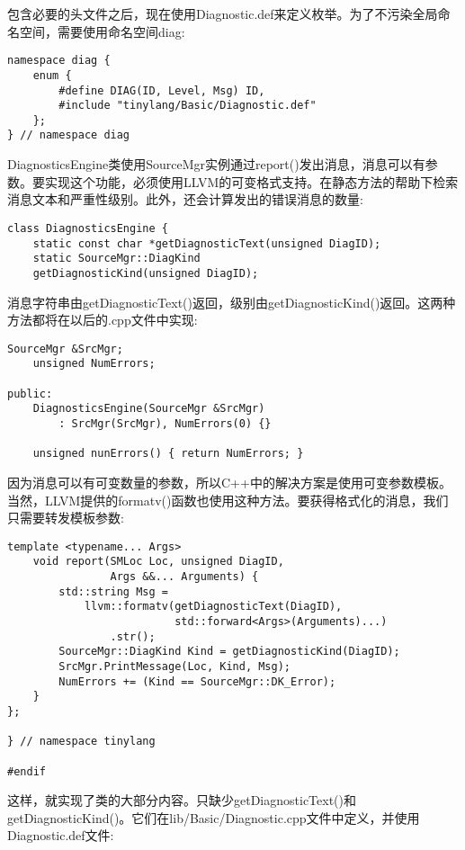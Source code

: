 包含必要的头文件之后，现在使用Diagnostic.def来定义枚举。为了不污染全局命名空间，需要使用命名空间diag:\par

\begin{lstlisting}[caption={}]
namespace diag {
	enum {
		#define DIAG(ID, Level, Msg) ID,
		#include "tinylang/Basic/Diagnostic.def"
	};
} // namespace diag
\end{lstlisting}

DiagnosticsEngine类使用SourceMgr实例通过report()发出消息，消息可以有参数。要实现这个功能，必须使用LLVM的可变格式支持。在静态方法的帮助下检索消息文本和严重性级别。此外，还会计算发出的错误消息的数量:\par

\begin{lstlisting}[caption={}]
class DiagnosticsEngine {
	static const char *getDiagnosticText(unsigned DiagID);
	static SourceMgr::DiagKind
	getDiagnosticKind(unsigned DiagID);
\end{lstlisting}

消息字符串由getDiagnosticText()返回，级别由getDiagnosticKind()返回。这两种方法都将在以后的.cpp文件中实现:\par

\begin{lstlisting}[caption={}]
	SourceMgr &SrcMgr;
	unsigned NumErrors;
	
public:
	DiagnosticsEngine(SourceMgr &SrcMgr)
		: SrcMgr(SrcMgr), NumErrors(0) {}
		
	unsigned nunErrors() { return NumErrors; }
\end{lstlisting}

因为消息可以有可变数量的参数，所以C++中的解决方案是使用可变参数模板。当然，LLVM提供的formatv()函数也使用这种方法。要获得格式化的消息，我们只需要转发模板参数:\par

\begin{lstlisting}[caption={}]
	template <typename... Args>
	void report(SMLoc Loc, unsigned DiagID,
				Args &&... Arguments) {
		std::string Msg =
			llvm::formatv(getDiagnosticText(DiagID),
						  std::forward<Args>(Arguments)...)
				.str();
		SourceMgr::DiagKind Kind = getDiagnosticKind(DiagID);
		SrcMgr.PrintMessage(Loc, Kind, Msg);
		NumErrors += (Kind == SourceMgr::DK_Error);
	}
};

} // namespace tinylang

#endif
\end{lstlisting}

这样，就实现了类的大部分内容。只缺少getDiagnosticText()和getDiagnosticKind()。它们在lib/Basic/Diagnostic.cpp文件中定义，并使用Diagnostic.def文件:\par

